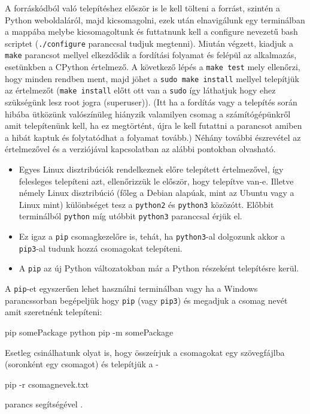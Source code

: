 A forráskódból való telepítéshez először is le kell tölteni a forrást,
szintén a Python weboldaláról, majd kicsomagolni, ezek után elnavigálunk
egy terminálban a mappába melybe kicsomagoltunk és futtatnunk kell a
configure nevezetű bash scriptet (\texttt{./configure} paranccsal tudjuk
megtenni). Miután végzett, kiadjuk a \texttt{make} parancsot mellyel
elkezdődik a fordítási folyamat és felépül az alkalmazás, esetünkben a
CPython értelmező. A következő lépés a \texttt{make test} mely
ellenőrzi, hogy minden rendben ment, majd jöhet a \texttt{sudo make
install} mellyel telepítjük az értelmezőt (\texttt{make install} előtt ott van a
\texttt{sudo} így láthatjuk hogy ehez szükségünk lesz root jogra (superuser)).
(Itt ha a fordítás vagy a telepítés során
hibába ütközünk valószínüleg hiányzik valamilyen csomag a
számítógépünkről amit telepítenünk kell, ha ez megtörtént, újra le kell
futattni a parancsot amiben a hibát kaptuk és folytatódhat a folyamat
tovább.)
Néhány további észrevétel az értelmezővel és a verziójával kapcsolatban az alábbi pontokban olvasható.
\begin{itemize}
\item
  Egyes Linux disztribúciók rendelkeznek előre telepített
  értelmezővel, így felesleges telepíteni azt, ellenőrizzük le először,
  hogy telepítve van-e. Illetve némely Linux disztribúció (főleg a
  Debian alapúak, mint az Ubuntu vagy a Linux mint) különbséget tesz a
  \texttt{python2} és \texttt{python3} közözótt. Előbbit terminálból \texttt{python} míg
  utóbbit \texttt{python3} paranccsal érjük el.
\item Ez igaz a \texttt{pip}
  csomagkezelőre is, tehát, ha \texttt{python3}-al dolgozunk akkor a
  \texttt{pip3}-al tudunk hozzá csomagokat telepíteni.
\item
A \texttt{pip} az új Python változatokban már a Python részeként
telepítésre kerül.
\end{itemize}


A \texttt{pip}-et \cite{pip} egyszerűen lehet használni terminálban vagy ha a Windows
parancssorban begépeljük hogy \texttt{pip} (vagy \texttt{pip3}) és megadjuk a csomag nevét
amit szeretnénk telepíteni:
\begin{python}
pip somePackage
python pip -m somePackage
\end{python}
Esetleg csinálhatunk olyat is, hogy összeírjuk a csomagokat egy
szövegfájlba (soronként egy csomagot) és telepítjük a - 
\begin{python}
pip -r csomagnevek.txt
\end{python}
parancs segítségével \cite{pip}.

